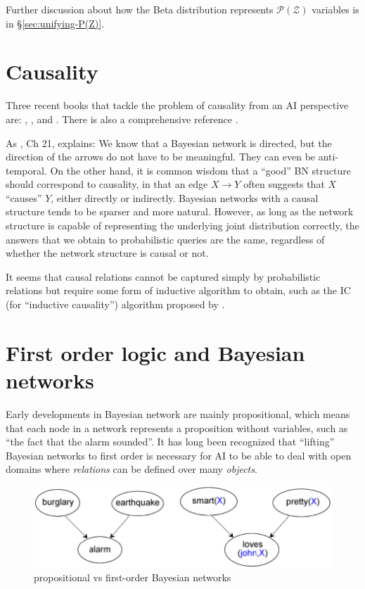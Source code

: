 Further discussion about how the Beta distribution represents $\mathcal{P(Z)}$ variables is in \S\ref{sec:unifying-P(Z)}.

\section{Causality}

Three recent books that tackle the problem of causality from an AI perspective are: \citep*{Shafer1996}, \citep*{Pearl2000}, and \citep*{Williamson2005}.  There is also a comprehensive reference \citep*{Beebee2009}.

As \citep*{Koller2009}, Ch 21, explains:  We know that a Bayesian network is directed, but the direction of the arrows do not have to be meaningful.  They can even be anti-temporal.  On the other hand, it is common wisdom that a ``good'' BN structure should correspond to causality, in that an edge $X \rightarrow Y$ often suggests that $X$ ``causes'' $Y$, either directly or indirectly.  Bayesian networks with a causal structure tends to be sparser and more natural.  However, as long as the network structure is capable of representing the underlying joint distribution correctly, the answers that we obtain to probabilistic queries are the same, regardless of whether the network structure is causal or not.


It seems that causal relations cannot be captured simply by probabilistic relations but require some form of inductive algorithm to obtain, such as the IC (for ``inductive causality'') algorithm proposed by \citep*{Pearl2000}.

\underconst

\section{First order logic and Bayesian networks}
\label{sec:FOL-BN}

Early developments in Bayesian network are mainly propositional, which means that each node in a network represents a proposition without variables, such as ``the fact that the alarm sounded''.  It has long been recognized that ``lifting'' Bayesian networks to first order is necessary for AI to be able to deal with open domains where \emph{relations} can be defined over many \emph{objects}.

\begin{figure}[H]
\centering
\includegraphics[scale=0.75]{FirstOrderBayesNet.png}
\caption{propositional vs first-order Bayesian networks}
\end{figure}

